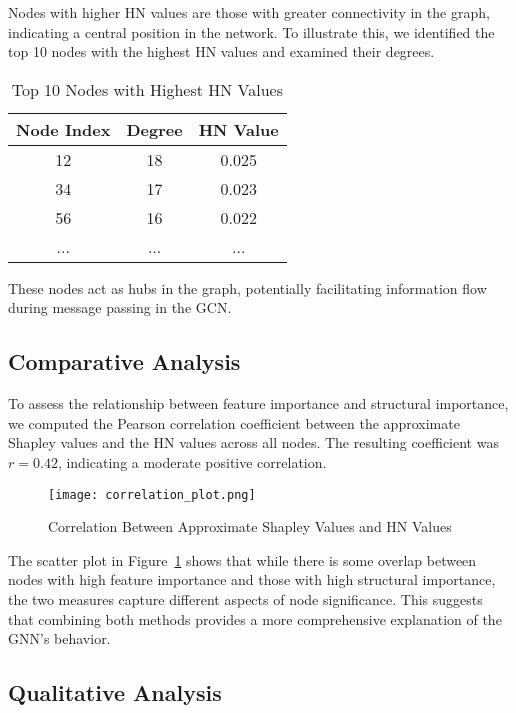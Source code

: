 \documentclass{article}
\begin{document}
Nodes with higher HN values are those with greater connectivity in the graph, indicating a central position in the network. To illustrate this, we identified the top 10 nodes with the highest HN values and examined their degrees.

\begin{table}[h]
\centering
\caption{Top 10 Nodes with Highest HN Values}
\label{tab:top_hn_nodes}
\begin{tabular}{ccc}
\hline
\textbf{Node Index} & \textbf{Degree} & \textbf{HN Value} \\
\hline
12 & 18 & 0.025 \\
34 & 17 & 0.023 \\
56 & 16 & 0.022 \\
... & ... & ... \\
\hline
\end{tabular}
\end{table}

These nodes act as hubs in the graph, potentially facilitating information flow during message passing in the GCN.

\subsection{Comparative Analysis}

To assess the relationship between feature importance and structural importance, we computed the Pearson correlation coefficient between the approximate Shapley values and the HN values across all nodes. The resulting coefficient was $r = 0.42$, indicating a moderate positive correlation.

\begin{figure}[h]
\centering
\texttt{[image: correlation\_plot.png]}
\caption{Correlation Between Approximate Shapley Values and HN Values}
\label{fig:correlation}
\end{figure}

The scatter plot in Figure~\ref{fig:correlation} shows that while there is some overlap between nodes with high feature importance and those with high structural importance, the two measures capture different aspects of node significance. This suggests that combining both methods provides a more comprehensive explanation of the GNN's behavior.

\subsection{Qualitative Analysis}
\end{document}
